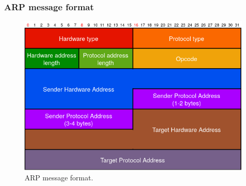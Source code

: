 \subsubsection{ARP message format}
\begin{figure}[H]
\centering
\includegraphics[scale=0.5]{Images/Layer2/arp_format}
\caption{\footnotesize{ARP message format.}}\label{ARP}
\end{figure}

